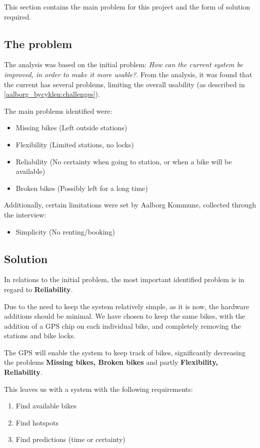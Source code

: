 This section contains the main problem for this project and the form of solution required.

\subsection{The problem}
The analysis was based on the initial problem: \textit{How can the current \citybike system be improved, in order to make it more usable?}.
From the analysis, it was found that the current \citybike has several problems, limiting the overall usability (as described in \cref{aalborg_bycyklen:challenges}).

The main problems identified were:
\begin{itemize}
\item Missing bikes (Left outside stations)
\item Flexibility (Limited stations, no locks)
\item Reliability (No certainty when going to station, or when a bike will be available)
\item Broken bikes (Possibly left for a long time)
\end{itemize}

Additionally, certain limitations were set by Aalborg Kommune, collected through the interview:

\begin{itemize}
\item Simplicity (No renting/booking)
\end{itemize}

\subsection{Solution}
In relations to the initial problem, the most important identified problem is in regard to \textbf{Reliability}.

Due to the need to keep the system relatively simple, as it is now, the hardware additions should be minimal.
We have chosen to keep the same bikes, with the addition of a GPS chip on each individual bike, and completely removing the stations and bike locks.

The GPS will enable the system to keep track of bikes, significantly decreasing the problems \textbf{Missing bikes, Broken bikes} and partly \textbf{Flexibility, Reliability}.

This leaves us with a system with the following requirements:
\begin{enumerate}
\item Find available bikes
\item Find hotspots
\item Find predictions (time or certainty)
\end{enumerate}

